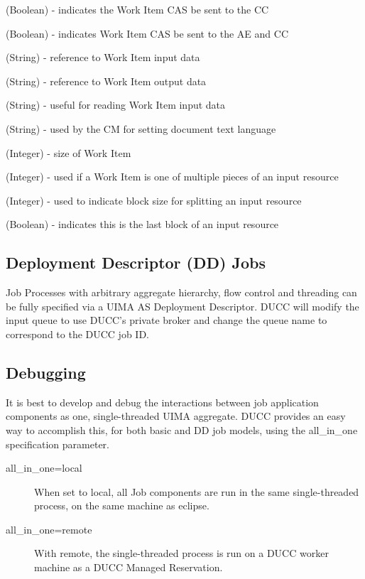 \begin{description}[labelindent=0.5in,leftmargin=0.5in]
  \item[sendToLast] (Boolean) - indicates the Work Item CAS be sent to the CC
  \item[sendToAll] (Boolean) - indicates Work Item CAS be sent to the AE and CC
  \item[inputspec] (String) - reference to Work Item input data
  \item[outputspec] (String) - reference to Work Item output data
  \item[encoding] (String) - useful for reading Work Item input data
  \item[language] (String) - used by the CM for setting document text language
  \item[bytelength] (Integer) - size of Work Item
  \item[blockindex] (Integer) - used if a Work Item is one of multiple pieces of an input resource
  \item[blocksize] (Integer) - used to indicate block size for splitting an input resource
  \item[lastBlock] (Boolean) - indicates this is the last block of an input resource
\end{description}

\subsection{Deployment Descriptor (DD) Jobs}
Job Processes with arbitrary aggregate hierarchy, flow control and threading can be fully specified
via a UIMA AS Deployment Descriptor. DUCC will modify the input queue to use DUCC's private
broker and change the queue name to correspond to the DUCC job ID.

\subsection{Debugging}
It is best to develop and debug the interactions between job application components as one, 
single-threaded UIMA aggregate. DUCC provides an easy way to accomplish this, for both basic
and DD job models, using the all\_in\_one specification parameter.

\begin{description}
    \item[all\_in\_one=local] When set to local, all Job components are run in the same
      single-threaded process, on the same machine as eclipse.
    \item[all\_in\_one=remote] With remote, the single-threaded process is run on a DUCC
      worker machine as a DUCC Managed Reservation. 
\end{description}

